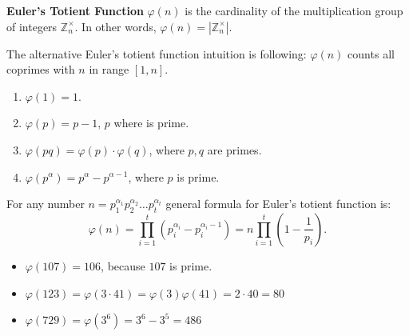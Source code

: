 \documentclass[../lecture-notes.tex]{subfiles}
\begin{document}
\begin{definition} \label{def:euler_totient_function}
    \textbf{Euler's Totient Function} $\varphi(n)$ is the cardinality of the multiplication 
    group of integers $\mathbb{Z}_n^{\times}$. In other words, $\varphi(n) = |\mathbb{Z}_n^{\times}|$.
\end{definition}

\begin{remark}
    The alternative Euler's totient function intuition is following: $\varphi(n)$ counts all coprimes with $n$ in range $[1, n]$. 
\end{remark}

\begin{lemma} 
    \hfill
    \begin{enumerate}
        \item $\varphi(1) = 1$.
        \item $\varphi(p) = p - 1$, $p$ where is prime.
        \item $\varphi(pq) = \varphi(p) \cdot \varphi(q)$, where $p, q$ are primes.
        \item $\varphi(p^{\alpha}) = p^{\alpha} - p^{\alpha - 1}$, where  $p$ is prime.        
    \end{enumerate}    
\end{lemma}

\begin{corollary}
    For any number $n = p_{1}^{\alpha_1}p_{2}^{\alpha_2} \dots p_{t}^{\alpha_t}$ general formula for Euler's totient function is: 
    \begin{equation*}
        \varphi(n) = \prod_{i = 1}^{t} \left( p_{i}^{\alpha_i} - p_{i}^{\alpha_i - 1} \right) = n \prod_{i = 1}^{t} \left( 1 - \frac{1}{p_i} \right).
    \end{equation*}
\end{corollary}

\begin{example}
    \hfill

    \begin{itemize}
        \item $\varphi(107) = 106$, because $107$ is prime.
        \item $\varphi(123) = \varphi(3 \cdot 41) = \varphi(3)\varphi(41) = 2 \cdot 40 = 80$
        \item $\varphi(729) = \varphi(3^6) = 3^6 - 3^5 = 486$
    \end{itemize}
\end{example}
\end{document}
